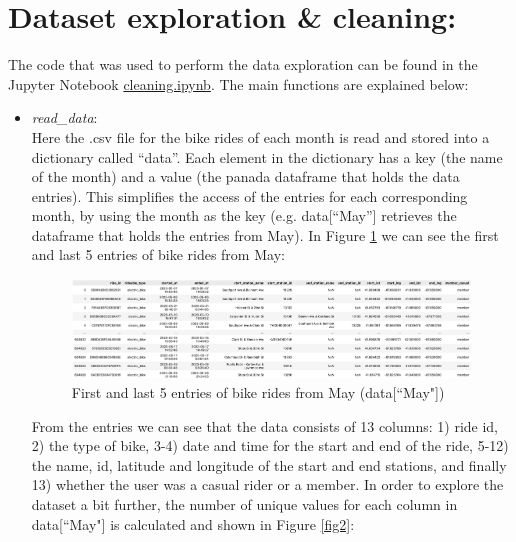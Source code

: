 \documentclass[12pt]{article}
\begin{document}
\section*{Dataset exploration \& cleaning:}
The code that was used to perform the data exploration can be found in the Jupyter Notebook \href{https://github.com/SummerKassem/BikeShareCS/blob/main/Code/cleaning.ipynb}{cleaning.ipynb}. The main functions are explained below:
\begin{itemize}
	\item \textit{read\_data}:\\
	Here the .csv file for the bike rides of each month is read and stored into a dictionary called “data”. Each element in the dictionary has a key (the name of the month) and a value (the panada dataframe that holds the data entries). This simplifies the access of the entries for each corresponding month, by using the month as the key (e.g. data[“May”] retrieves the dataframe that holds the entries from May). In Figure \ref{fig1} we can see the first and last 5 entries of bike rides from May:

	\begin{figure}[h]
	\hspace{-1.8cm}
	\includegraphics[width=8 in, height = 2 in]{imgMay.png}
	\caption{First and last 5 entries of bike rides from May (data[``May"])}
	\label{fig1}
	\end{figure}
	\pagebreak
	
	From the entries we can see that the data consists of 13 columns: 1) ride id, 2) the type of bike, 3-4) date and time for the start and end of the ride, 5-12) the name, id, latitude and longitude of the start and end stations, and finally 13) whether the user was a casual rider or a member. In order to explore the dataset a bit further, the number of unique values for each column in data[``May"] is calculated and shown in Figure \ref{fig2}:
	

\end{itemize}
\end{document}
